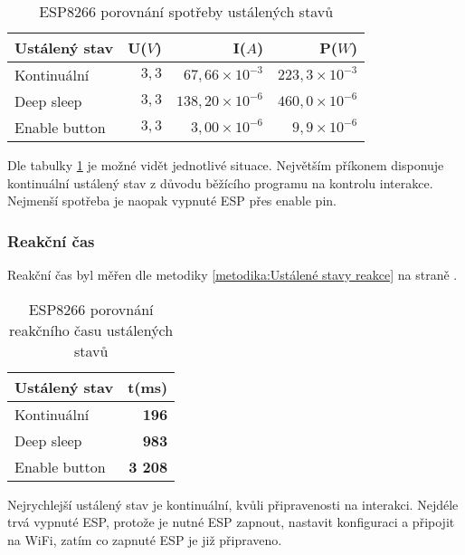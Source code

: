 \documentclass[a4paper, 12pt]{report}
\begin{document}
					\begin{table}[h]
						\centering
						\caption{ESP8266 porovnání spotřeby ustálených stavů}
						\begin{tabular}{||l|r r r||}
							\hline
							Ustálený stav & U($V$) & I($A$) & P($W$)\\
							\hline
							Kontinuální & $3,3$& $67,66 \times 10^{-3}$ & $223,3 \times 10^{-3}$\\
							Deep sleep& $3,3$ & $138,20 \times 10^{-6}$  & $460,0 \times 10^{-6}$\\
							Enable button & $3,3$ & $3,00\times 10^{-6}$ & $9,9\times 10^{-6}$\\
							\hline
						\end{tabular}
						\label{ESP8266 klidové režimy spotřeba}
					\end{table}
					Dle tabulky \ref{ESP8266 klidové režimy spotřeba} je možné vidět jednotlivé situace. Největším příkonem disponuje kontinuální ustálený stav z důvodu běžícího programu na kontrolu interakce. Nejmenší spotřeba je naopak vypnuté ESP přes enable pin. \\
				\subsubsection{Reakční čas}
			 		Reakční čas byl měřen dle metodiky \ref{metodika:Ustálené stavy reakce} na straně \pageref{metodika:Ustálené stavy reakce}.
				 	\begin{table}[]
					 \centering
					 \caption{ESP8266 porovnání reakčního času ustálených stavů}
					 \begin{tabular}{||l|r||}
						 \hline
						 Ustálený stav & t(ms)\\
						 \hline
						 Kontinuální & {\bf 196}\\
						 Deep sleep & {\bf 983}\\
						 Enable button & {\bf 3 208}\\
						 \hline
					 \end{tabular}
					 \label{ESP8266 klidové režimy čas}
				 	\end{table}
					Nejrychlejší ustálený stav je kontinuální, kvůli připravenosti na interakci. Nejdéle trvá vypnuté ESP, protože je nutné ESP zapnout, nastavit konfiguraci a připojit na WiFi, zatím co zapnuté ESP je již připraveno.
\end{document}
